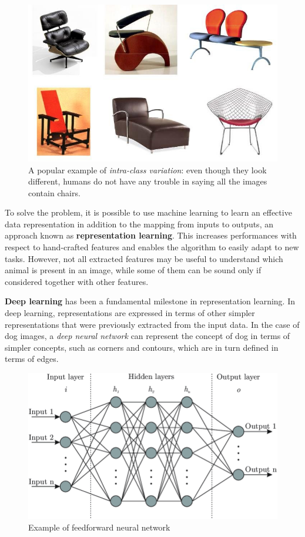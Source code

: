 \documentclass[%
    corpo=12pt,
    twoside,
    stile=classica,   
    tipotesi=magistrale,
    evenboxes,
    english,
	numerazioneromana,
]{toptesi}
\begin{document}
\begin{figure}[ht]
	\centering
	\includegraphics[width=.75\linewidth]{imgs/chairs.png}
	\caption{A popular example of \textit{intra-class variation}: even though they look different, humans do not have any trouble in saying all the images contain chairs.}
	\label{fig:intraclass}
\end{figure}

To solve the problem, it is possible to use machine learning to learn an effective data representation in addition to the mapping from inputs to outputs, an approach known as \textbf{representation learning}. This increases performances with respect to hand-crafted features and enables the algorithm to easily adapt to new tasks. However, not all extracted features may be useful to understand which animal is present in an image, while some of them can be sound only if considered together with other features.

\bigskip
\textbf{Deep learning} has been a fundamental milestone in representation learning. In deep learning, representations are expressed in terms of other simpler representations that were previously extracted from the input data. In the case of dog images, a \textit{deep neural network} can represent the concept of dog in terms of simpler concepts, such as corners and contours, which are in turn defined in terms of edges.

\begin{figure}[ht]
	\centering
	\includegraphics[width=.8\linewidth]{imgs/mlp.png}
	\caption{Example of feedforward neural network}
	\label{fig:mlp}
\end{figure}
\end{document}
